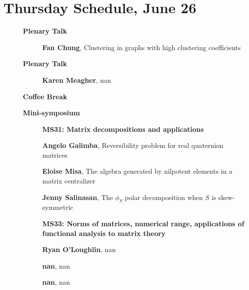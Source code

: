 \documentclass[ILAS2025-program.tex]{subfiles}
\begin{document}
\section{Thursday Schedule, June 26}
    
    \begin{description}
    \item[] \textbf{Plenary Talk} 
    \begin{description}
        \item[] \textbf{Fan Chung}, Clustering in graphs with high clustering coefficients
        \end{description}
        \item[] \textbf{Plenary Talk} 
    \begin{description}
        \item[] \textbf{Karen Meagher}, nan
        \end{description}
        \item[] \textbf{Coffee Break} 
    \item[] \textbf{Mini-symposium} 
    \begin{description}
    \item[] {\color{mstitle}\textbf{MS31: Matrix decompositions and applications}} 
    \item[] \textbf{Angelo Galimba}, Reversibility problem for real quaternion matrices
        \item[] \textbf{Eloise Misa}, The algebra generated by nilpotent elements in a matrix centralizer
        \item[] \textbf{Jenny Salinasan}, The $\phi_S$ polar decomposition when $S$ is skew-symmetric
        \end{description}
    \begin{description}
    \item[] {\color{mstitle}\textbf{MS33: Norms of matrices, numerical range, applications of functional analysis to matrix theory}} 
    \item[] \textbf{Ryan O'Loughlin}, nan
        \item[] \textbf{nan}, nan
        \item[] \textbf{nan}, nan

\end{description}
\end{description}
\end{document}

